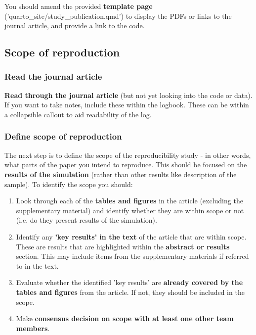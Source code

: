 You should amend the provided \textbf{template page} ('quarto\_site/study\_publication.qmd') to display the PDFs or links to the journal article, and provide a link to the code.

\vspace{0.5cm}
\subsection{Scope of reproduction}

\subsubsection{Read the journal article}

\textbf{Read through the journal article} (but not yet looking into the code or data). If you want to take notes, include these within the logbook. These can be within a collapsible callout to aid readability of the log.

\vspace{0.5cm}
\subsubsection{Define scope of reproduction}

The next step is to define the scope of the reproducibility study - in other words, what parts of the paper you intend to reproduce. This should be focused on the \textbf{results of the simulation} (rather than other results like description of the sample). To identify the scope you should:

\begin{enumerate}
    \item Look through each of the \textbf{tables and figures} in the article (excluding the supplementary material) and identify whether they are within scope or not (i.e. do they present results of the simulation).
    \item Identify any \textbf{'key results' in the text} of the article that are within scope. These are results that are highlighted within the \textbf{abstract or results} section. This may include items from the supplementary materials if referred to in the text.
    \item Evaluate whether the identified 'key results' are \textbf{already covered by the tables and figures} from the article. If not, they should be included in the scope.
    \item Make \textbf{consensus decision on scope with at least one other team members}.
\end{enumerate}


